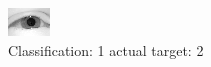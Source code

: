 \begin{figure}[h!]
\begin{center}
\includegraphics[width=0.60\columnwidth]{figures/ID2301_class_1_target_2.png}
\end{center}
\caption{ Classification: 1 actual target: 2}
\label{fig:ID2301_class_1_target_2}
\end{figure}
